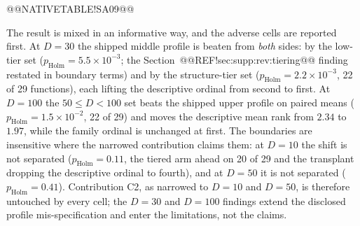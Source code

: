 \documentclass[10pt,a4paper]{article}
\begin{document}
@@NATIVETABLE!SA09@@




The result is mixed in an informative way, and the adverse cells are reported
first.  At $D = 30$ the shipped middle profile is beaten from \emph{both}
sides: by the low-tier set ($p_{\mathrm{Holm}} = 5.5\times10^{-3}$; the
Section~@@REF!sec:supp:rev:tiering@@ finding restated in boundary terms) and by
the structure-tier set ($p_{\mathrm{Holm}} = 2.2\times10^{-3}$, 22 of 29
functions), each lifting the descriptive ordinal from second to first.  At
$D = 100$ the $50 \leq D < 100$ set beats the shipped upper profile on paired
means ($p_{\mathrm{Holm}} = 1.5\times10^{-2}$, 22 of 29) and moves the
descriptive mean rank from $2.34$ to $1.97$, while the family
ordinal is unchanged at first.  The boundaries are insensitive where the
narrowed contribution claims them: at $D = 10$ the shift is not separated
($p_{\mathrm{Holm}} = 0.11$, the tiered arm ahead on 20 of 29 and the
transplant dropping the descriptive ordinal to fourth), and at $D = 50$ it is
not separated ($p_{\mathrm{Holm}} = 0.41$).  Contribution C2, as narrowed to
$D = 10$ and $D = 50$, is therefore untouched by every cell; the $D = 30$ and
$D = 100$ findings extend the disclosed profile mis-specification and enter
the limitations, not the claims.









\clearpage
\end{document}
